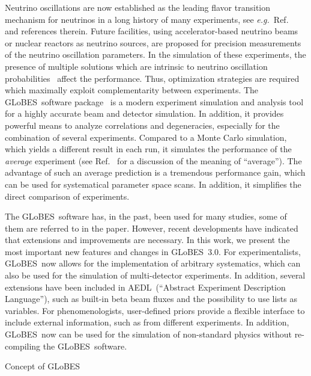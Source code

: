\documentclass[12pt,a4paper]{article}
\makeatletter
\renewcommand{\section}{\@startsection{section}{1}{0em}{-\baselineskip}%
{\baselineskip}{\normalfont\large\bfseries}}
\newcommand{\eg}{{\it e.g.}}
\newcommand{\Ref}{Ref.}
\newcommand{\GLOBES}{{\sf GLoBES}}
\newcommand{\GLOBESN}{{\sf GLoBES~3.0}}
\newcommand{\AEDL}{{\sf AEDL}}
\makeatother
\begin{document}
Neutrino oscillations are now established as the leading flavor
transition mechanism for neutrinos in a long history of many experiments, see
\eg\ \Ref~\cite{Barger:2003qi} and references therein. Future facilities, using accelerator-based
 neutrino beams or nuclear reactors as neutrino sources, are proposed
for precision measurements of the neutrino oscillation parameters. In the
simulation of these experiments, 
the presence of multiple solutions which are intrinsic to
 neutrino oscillation probabilities~\cite{Fogli:1996pv,Burguet-Castell:2001ez,Minakata:2001qm,Barger:2001yr} 
affect the performance.
Thus, optimization strategies are required which maximally exploit 
complementarity between experiments. The \GLOBES\ software package~\cite{Huber:2004ka}
is a  modern experiment  simulation  and analysis tool for
a highly accurate beam and detector simulation. In addition, it provides powerful 
means to analyze correlations and degeneracies, especially for the combination
of several experiments. Compared to a Monte Carlo simulation, which yields a different
result in each run, it simulates the performance of the {\em average} experiment
(see \Ref~\cite{Schwetz:2006md} for a discussion of the meaning of ``average'').
The advantage of such an average prediction is a tremendous performance gain,
which can be used for systematical parameter space scans. In addition, it 
simplifies the direct comparison of experiments.

The \GLOBES\ software has, in the past, been used for many studies, some of them
are referred to in the paper. However, recent developments have indicated that extensions
and improvements are necessary. In this work, we present the most important new
features and changes in \GLOBESN . For experimentalists, \GLOBES\ now allows
for the implementation of arbitrary systematics, which can also be used for
the simulation of multi-detector experiments. In addition, several extensions
have been included in \AEDL\ (``Abstract Experiment Description Language''), such as
built-in beta beam fluxes and the possibility to use lists as variables.
For phenomenologists, user-defined
priors provide a flexible interface to include external information, such as from
different experiments. In addition, \GLOBES\ now can be used for the simulation
of non-standard physics without re-compiling the \GLOBES\ software.

\section{Concept of \GLOBES }
\end{document}

